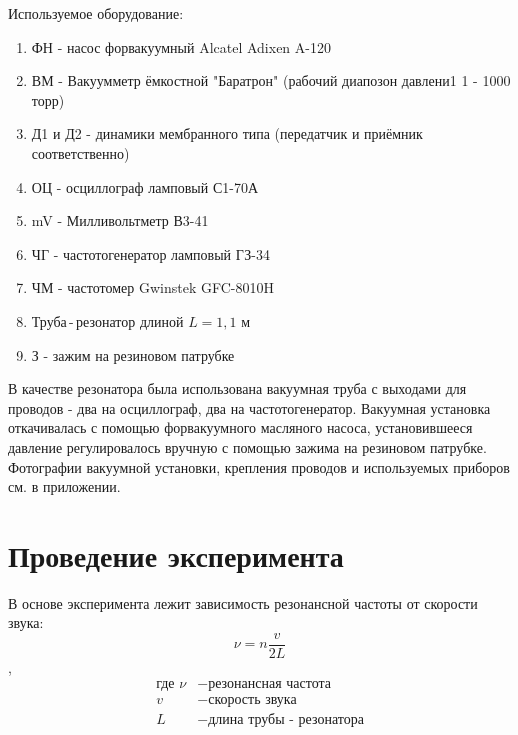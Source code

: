 \documentclass[a4paper,12pt]{article}
\begin{document}
Используемое оборудование:
\begin{enumerate}
    \item ФН - насос форвакуумный Alcatel Adixen A-120
    \item ВМ - Вакуумметр ёмкостной "Баратрон" (рабочий диапозон давлени1 1 - 1000 торр)
    \item Д1 и Д2 - динамики мембранного типа (передатчик и приёмник соответственно)
    \item ОЦ - осциллограф ламповый С1-70А
    \item mV - Милливольтметр В3-41
    \item ЧГ - частотогенератор ламповый ГЗ-34
    \item ЧМ - частотомер Gwinstek GFC-8010H
    \item Труба\,-\,резонатор длиной $L = 1,1 \text{ м}$
    \item З - зажим на резиновом патрубке
\end{enumerate}

В качестве резонатора была использована вакуумная труба с выходами для проводов - два на осциллограф, два на частотогенератор. Вакуумная установка откачивалась с помощью форвакуумного масляного насоса, установившееся давление регулировалось вручную с помощью зажима на резиновом патрубке.
Фотографии вакуумной установки, крепления проводов и используемых приборов см. в приложении.

\section{Проведение эксперимента}


В основе эксперимента лежит зависимость резонансной частоты от скорости звука:
$$\nu = n \frac{v}{2L}$$,
\begin{equation}
\begin{aligned}
    \nonumber
	\text{где } \nu  &- \text{резонансная частота}\\
	v  &- \text{скорость звука}\\
	L  &- \text{длина трубы - резонатора}\\
\end{aligned}
\end{equation} 
\end{document}

